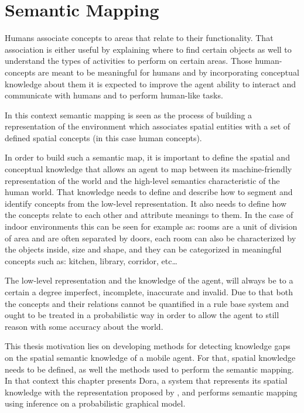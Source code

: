 \chapter{Semantic Mapping}\label{chap:semantic-mapping}

Humans associate concepts to areas that relate to their functionality. That
association is either useful by explaining where to find certain objects as well to
understand the types of activities to perform on certain areas. 
Those human-concepts are meant to be meaningful for humans and by incorporating conceptual
knowledge about them it is expected to improve the agent ability to interact and communicate
with humans and to perform human-like tasks.

In this context semantic mapping is seen as the process of building a representation of
the environment which associates spatial entities with a set of defined spatial concepts (in this case human concepts).

In order to build such a semantic map, it is important to define the spatial and conceptual knowledge
that allows an agent to map between its machine-friendly representation of the world and the high-level semantics
characteristic of the human world.
That knowledge needs to define and describe how to segment and identify concepts from the low-level representation.
It also needs to define how the concepts relate to each other and attribute meanings to them.
In the case of indoor environments this can be seen for example as: rooms are a unit of division of area and are
often separated by doors, each room can also be characterized by the objects inside, size and shape, and they
can be categorized in meaningful concepts such as: kitchen, library, corridor, etc\dots

The low-level representation and the knowledge of the agent, will always be to a certain a degree imperfect,
incomplete, inaccurate and invalid. Due to that both the concepts and their relations
cannot be quantified in a rule base system and ought to be treated in a probabilistic way in order to allow
the agent to still reason with some accuracy about the world.

This thesis motivation lies on developing methods for detecting knowledge gaps on the spatial
semantic knowledge of a mobile agent. For that, spatial knowledge needs to be defined, as well
the methods used to perform the semantic mapping.
In that context this chapter presents \gls{Dora}, a system that represents its spatial knowledge
with the representation proposed by \cite{pronobis2010ias}, and performs semantic mapping using
inference on a probabilistic graphical model.



